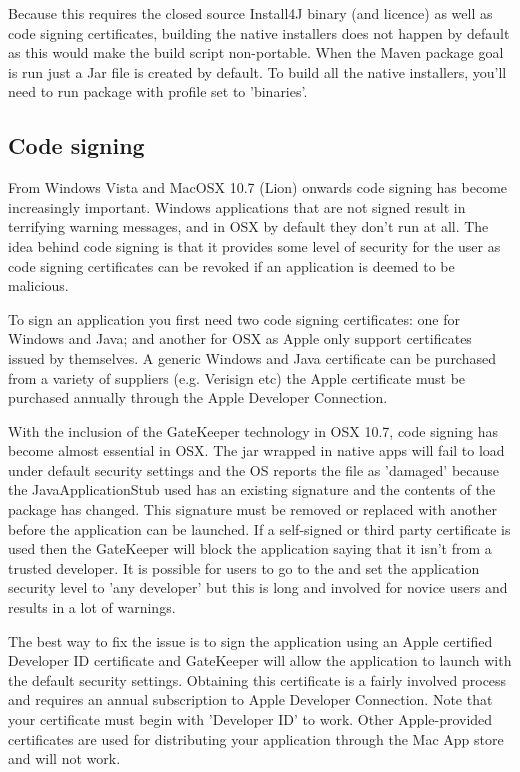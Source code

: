 Because this requires the closed source Install4J binary (and licence) as well as code signing certificates, building the native installers does not happen by default as this would make the build script non-portable. When the Maven package goal is run just a Jar file is created by default.  To build all the native installers, you'll need to run package with profile set to 'binaries'.  

\subsection{Code signing}

From Windows Vista and MacOSX 10.7 (Lion) onwards code signing has become increasingly important. Windows applications that are not signed result in terrifying warning messages, and in OSX by default they don't run at all. The idea behind code signing is that it provides some level of security for the user as code signing certificates can be revoked if an application is deemed to be malicious.

To sign an application you first need two code signing certificates: one for Windows and Java; and another for OSX as Apple only support certificates issued by themselves. A generic Windows and Java certificate can be purchased from a variety of suppliers (e.g. Verisign etc) the Apple certificate must be purchased annually through the Apple Developer Connection.

With the inclusion of the GateKeeper technology in OSX 10.7, code signing has become almost essential in OSX. The jar wrapped in native apps will fail to load under default security settings and the OS reports the file as 'damaged' because the JavaApplicationStub used has an existing signature and the contents of the package has changed. This signature must be removed or replaced with another before the application can be launched. If a self-signed or third party certificate is used then the GateKeeper will block the application saying that it isn't from a trusted developer. It is possible for users to go to the  and set the application security level to 'any developer' but this is long and involved for novice users and results in a lot of warnings.

The best way to fix the issue is to sign the application using an Apple certified Developer ID certificate and GateKeeper will allow the application to launch with the default security settings. Obtaining this certificate is a fairly involved process and requires an annual subscription to Apple Developer Connection. Note that your certificate must begin with 'Developer ID' to work. Other Apple-provided certificates are used for distributing your application through the Mac App store and will not work.

